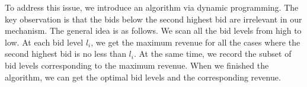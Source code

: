\documentclass[letterpaper]{article}
\begin{document}
To address this issue, we introduce an algorithm via dynamic programming.
The key observation is that the bids below the second highest bid are irrelevant in our mechanism.
The general idea is as follows.
We scan all the bid levels from high to low.
At each bid level $l_i$, we get the maximum revenue for all the cases where the second highest bid is no less than $l_i$.
At the same time, we record the subset of bid levels corresponding to the maximum revenue.
When we finished the algorithm, we can get the optimal bid levels and the corresponding revenue.
\end{document}
